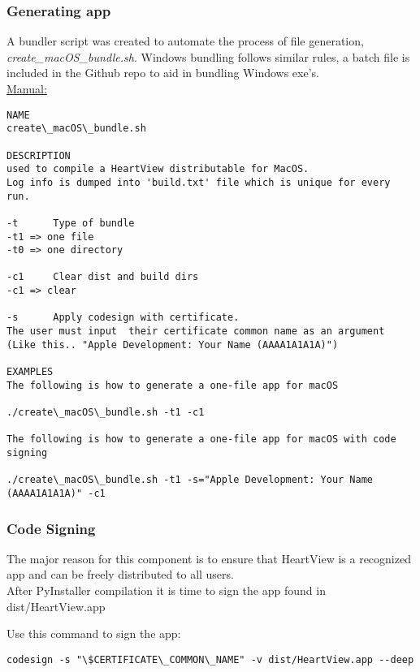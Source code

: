 \documentclass[11pt,fleqn]{book} %
\begin{document}
\subsubsection{Generating app}

A bundler script was created to automate the process of file generation, \textit{create\_macOS\_bundle.sh}. Windows bundling follows similar rules, a batch file is included in the Github repo to aid in bundling Windows exe's.\\

\underline{Manual:}

\begin{verbatim}
NAME 
create\_macOS\_bundle.sh

DESCRIPTION
used to compile a HeartView distributable for MacOS. 
Log info is dumped into 'build.txt' file which is unique for every run.

-t      Type of bundle
-t1 => one file
-t0 => one directory

-c1     Clear dist and build dirs 
-c1 => clear

-s      Apply codesign with certificate. 
The user must input  their certificate common name as an argument 
(Like this.. "Apple Development: Your Name (AAAA1A1A1A)")

EXAMPLES
The following is how to generate a one-file app for macOS

./create\_macOS\_bundle.sh -t1 -c1 

The following is how to generate a one-file app for macOS with code signing

./create\_macOS\_bundle.sh -t1 -s="Apple Development: Your Name (AAAA1A1A1A)" -c1 
\end{verbatim}

\subsubsection{Code Signing}

The major reason for this component is to ensure that HeartView is a recognized app and can be freely distributed to all users.\\

After PyInstaller compilation it is time to sign the app found in dist/HeartView.app

Use this command to sign the app:\\
\begin{verbatim}codesign -s "\$CERTIFICATE\_COMMON\_NAME" -v dist/HeartView.app --deep \end{verbatim}
\end{document}
